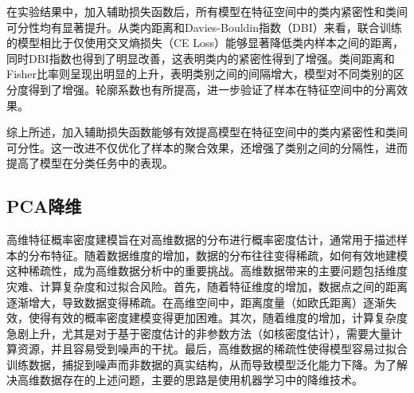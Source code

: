 \begin{table}[h]
\captionsetup{font=small, justification=centering}
\centering
\renewcommand{\arraystretch}{1.2} %
\setlength{\tabcolsep}{6pt} %
\caption{对比加入辅助损失函数前后特征空间类内紧密性和类间可分性的变化}
\label{feature_analysis}
\end{table}

在实验结果中，加入辅助损失函数后，所有模型在特征空间中的类内紧密性和类间可分性均有显著提升。从类内距离和Davies-Bouldin指数（DBI）来看，联合训练的模型相比于仅使用交叉熵损失（CE Loss）能够显著降低类内样本之间的距离，同时DBI指数也得到了明显改善，这表明类内的紧密性得到了增强。类间距离和Fisher比率则呈现出明显的上升，表明类别之间的间隔增大，模型对不同类别的区分度得到了增强。轮廓系数也有所提高，进一步验证了样本在特征空间中的分离效果。

综上所述，加入辅助损失函数能够有效提高模型在特征空间中的类内紧密性和类间可分性。这一改进不仅优化了样本的聚合效果，还增强了类别之间的分隔性，进而提高了模型在分类任务中的表现。


\subsection{PCA降维}

高维特征概率密度建模旨在对高维数据的分布进行概率密度估计，通常用于描述样本的分布特征。随着数据维度的增加，数据的分布往往变得稀疏，如何有效地建模这种稀疏性，成为高维数据分析中的重要挑战。高维数据带来的主要问题包括维度灾难、计算复杂度和过拟合风险。首先，随着特征维度的增加，数据点之间的距离逐渐增大，导致数据变得稀疏。在高维空间中，距离度量（如欧氏距离）逐渐失效，使得有效的概率密度建模变得更加困难。其次，随着维度的增加，计算复杂度急剧上升，尤其是对于基于密度估计的非参数方法（如核密度估计），需要大量计算资源，并且容易受到噪声的干扰。最后，高维数据的稀疏性使得模型容易过拟合训练数据，捕捉到噪声而非数据的真实结构，从而导致模型泛化能力下降。为了解决高维数据存在的上述问题，主要的思路是使用机器学习中的降维技术。

